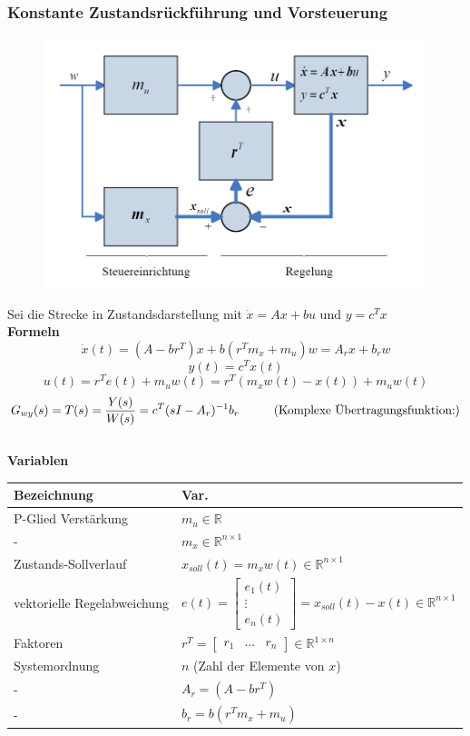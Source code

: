 \documentclass[10pt,a4paper]{article}
\newcommand{\tab}[1][1]{\hspace*{#1cm}}
\newcommand{\vect}[1]{\ensuremath{\begin{bmatrix}#1\end{bmatrix}}}
\begin{document}
\subsubsection{Konstante Zustandsrückführung und Vorsteuerung}
\label{zustandsrueckfuehrung}
\begin{figure}[H]
	\includegraphics[width=0.7\columnwidth]{imgs/abb7_10.png}
\end{figure}

Sei die Strecke in Zustandsdarstellung mit $\dot x = Ax + bu$ und $y = c^T x$ \\

\textbf{Formeln}
$$
	\dot x(t) = (A - br^T)x + b(r^T m_x + m_u) w = A_r x + b_r w
$$
$$
	y(t) = c^Tx(t)
$$
$$
	u(t) = r^Te(t) + m_uw(t) = r^T(m_xw(t)-x(t)) + m_u w(t)
$$
$$
	G_{wy}(s) = T(s) = \frac{Y(s)}{W(s)} = c^T(sI-A_r)^{-1}b_r \tab (\text{Komplexe Übertragungsfunktion:})
$$ ~\\

\textbf{Variablen} ~\\
\begin{tabularx}{\columnwidth}{ll}
	Bezeichnung & Var. \\
	\hline
	P-Glied Verstärkung & $m_u \in \mathbb{R}$ \\
	\tab - & $m_x \in \mathbb{R}^{n \times 1}$  \\
	Zustands-Sollverlauf & $x_{soll}(t) = m_xw(t) \in \mathbb{R}^{n \times 1}$  \\
	vektorielle Regelabweichung & $e(t) = \vect{e_1(t) \\ \vdots \\ e_n(t)} = x_{soll}(t) - x(t) \in \mathbb{R}^{n \times 1}$  \\
	Faktoren & $r^T = \vect{r_1 & \dots & r_n} \in \mathbb{R}^{1 \times n}$ \\
	Systemordnung & $n$ (Zahl der Elemente von $x$) \\
	\tab - & $A_r = (A - br^T)$ \\
	\tab - & $b_r = b(r^Tm_x + m_u)$ \\
\end{tabularx} ~\\
\end{document}
